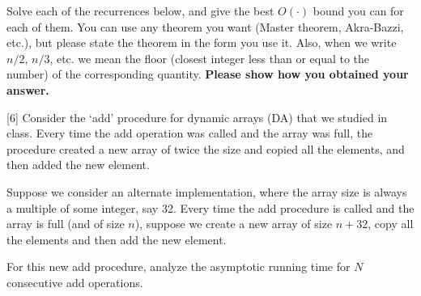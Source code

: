 \documentclass[addpoints, 11pt]{exam}
\begin{document}
\begin{questions}

Solve each of the recurrences below, and give the best $O(\cdot)$ bound you can for each of them. You can use any theorem you want (Master theorem, Akra-Bazzi, etc.), but please state the theorem in the form you use it. Also, when we write $n/2$, $n/3$, etc. we mean the floor (closest integer less than or equal to the number) of the corresponding quantity.  {\bf Please show how you obtained your answer.}


[6]
Consider the `add' procedure for dynamic arrays (DA) that we studied in class. Every time the add operation was called and the array was full, the procedure created a new array of twice the size and copied all the elements, and then added the new element.

Suppose we consider an alternate implementation, where the array size is always a multiple of some integer, say 32. Every time the add procedure is called and the array is full (and of size $n$), suppose we create a new array of size $n + 32$, copy all the elements and then add the new element.

For this new add procedure, analyze the asymptotic running time for $N$ consecutive add operations. 
\end{questions}
\end{document}
